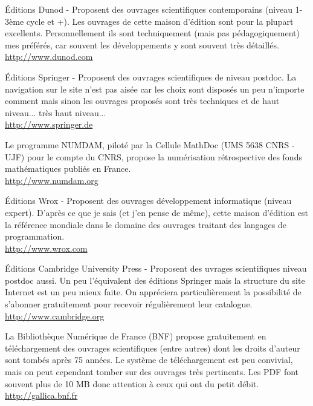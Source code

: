 	{\Large {}}{\Large {}}{\Large {}}{\Large {}}\bcdfrance{} Éditions Dunod - Proposent des ouvrages scientifiques contemporains (niveau 1-3ème cycle et +). Les ouvrages de cette maison d'édition sont pour la plupart excellents. Personnellement ils sont techniquement (mais pas pédagogiquement) mes préférés, car souvent les développements y sont souvent très détaillés.\\
	\href{http://www.dunod.com}{\color{blue}http://www.dunod.com}
	
	{\Large {}}{\Large {}} Éditions Springer - Proposent des ouvrages scientifiques de niveau postdoc. La navigation sur le site n'est pas aisée car les choix sont disposés un peu n'importe comment mais sinon les ouvrages proposés sont très techniques et de haut niveau... très haut niveau...\\
	\href{http://www.springer.de}{\color{blue}http://www.springer.de}
	
	{\Large {}}{\Large {}}{\Large {}}\bcdfrance{} Le programme NUMDAM, piloté par la Cellule MathDoc (UMS 5638 CNRS - UJF) pour le compte du CNRS, propose la numérisation rétrospective des fonds mathématiques publiés en France.\\
	\href{http://www.numdam.org}{\color{blue}http://www.numdam.org}
	
	{\Large {}}{\Large {}}{\Large {}}{\Large {}} Éditions Wrox - Proposent des ouvrages développement informatique (niveau expert). D'après ce que je sais (et j'en pense de même), cette maison d'édition est la référence mondiale dans le domaine des ouvrages traitant des langages de programmation.\\
	\href{http://www.wrox.com}{\color{blue}http://www.wrox.com}
	
	{\Large {}}{\Large {}}{\Large {}} Éditions Cambridge University Press - Proposent des uvrages scientifiques niveau postdoc aussi. Un peu l'équivalent des éditions Springer mais la structure du site Internet est un peu mieux faite. On appréciera particulièrement la possibilité de s'abonner gratuitement pour recevoir régulièrement leur catalogue.\\
	\href{http://www.cambridge.org}{\color{blue}http://www.cambridge.org}
	
	
	{\Large {}}{\Large {}}{\Large {}}{\Large {}} La Bibliothèque Numérique de France (BNF) propose gratuitement en téléchargement des ouvrages scientifiques (entre autres) dont les droits d'auteur sont tombés après 75 années. Le système de téléchargement est peu convivial, mais on peut cependant tomber sur des ouvrages très pertinents. Les PDF font souvent plus de 10 MB donc attention à ceux qui ont du petit débit.\\
	\href{http://gallica.bnf.fr}{\color{blue} http://gallica.bnf.fr}
	

